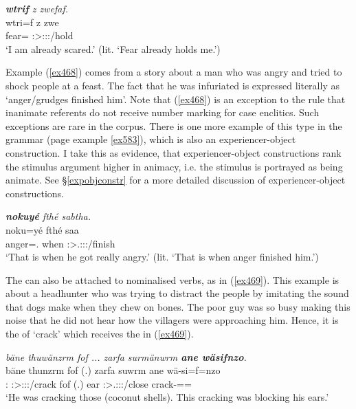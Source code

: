 \begin{exe}
	\ex \emph{\textbf{wtrif} z zwefaf.}\\
	\gll wtri=f z zwe\\
	fear={\Erg} {\Iam} \Stsg:\Sbj>\Fsg:\Obj:\Rpst:\Pfv/hold\\
	\trans `I am already scared.' (lit. `Fear already holds me.')
	\label{ex467}
\end{exe}

Example (\ref{ex468}) comes from a story about a man who was angry and tried to shock people at a feast. The fact that he was infuriated is expressed literally as `anger/grudges finished him'. Note that (\ref{ex468}) is an exception to the rule that inanimate referents do not receive number marking for case enclitics. Such exceptions are rare in the corpus. There is one more example of this type in the grammar (page \pageref{ex583} example \ref{ex583}), which is also an experiencer-object construction. I take this as evidence, that experiencer-object constructions rank the stimulus argument higher in animacy, i.e. the stimulus is portrayed as being animate. See \S\ref{expobjconstr} for a more detailed discussion of experiencer-object constructions.

\begin{exe}
	\ex \emph{\textbf{nokuyé} fthé sabtha.}\\
	\gll noku=yé fthé saa\\
	anger=\Erg.{\Nsg} when \Stsg:\Sbj>\Tsg.\Masc:\Obj:\Pst:\Pfv/finish\\
	\trans `That is when he got really angry.' (lit. `That is when anger finished him.')\\
	\label{ex468}
\end{exe}

The   can also be attached to nominalised verbs, as in (\ref{ex469}). This example is about a  headhunter who was trying to distract the people by imitating the sound that dogs make when they chew on bones. The poor guy was so busy making this noise that he did not hear how the villagers were approaching him. Hence, it is the  of `crack' which receives the   in (\ref{ex469}).

\begin{exe}
	\ex \emph{bäne thuwänzrm fof ... zarfa surmänwrm \textbf{ane wäsifnzo}.}\\
	\gll bäne thunzrm fof (.) zarfa suwrm ane wä-si=f=nzo\\
	\Dem:\Med{} \Stsg:\Sbj>\Stpl:\Obj:\Pst:\Dur/crack fof (.) ear \Stsg:\Sbj>\Tsg.\Masc:\Obj:\Pst:\Dur/close {\Dem} crack-\Nmlz=\Erg=\Only\\
	\trans `He was cracking those (coconut shells). This cracking was blocking his ears.'\\
	\label{ex469}
\end{exe}

